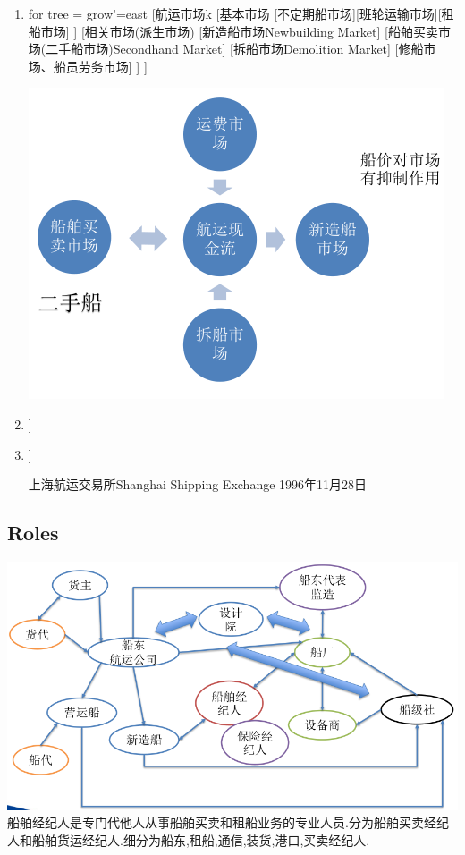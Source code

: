 \documentclass[UTF8,a4paper]{ctexart}
\begin{document}
	\begin{enumerate}[1)]
		\item 	\begin{forest}
			for tree = {grow'=east}
			[航运市场k [基本市场 
							[不定期船市场][班轮运输市场][租船市场]
							]
			   		 [相关市场(派生市场)
			   		 		[新造船市场Newbuilding Market]
			   		 		[船舶买卖市场(二手船市场)Secondhand Market]
			   		 		[拆船市场Demolition Market]
			   		 		[修船市场、船员劳务市场]
			   		 		]
			   		 ]
		\end{forest}
		\includegraphics[scale=0.7]{cashflow}
		
		\item \begin{forest}
			[国际主要航运交易市场
								[伦敦市场]
								[纽约市场]
								[汉堡奥斯陆市场]
								[东京市场]
								[香港市场]
								]
		\end{forest}
		\item \begin{forest}
			[航交所
				[规范航运市场交易行为]
				[调节航运市场价格]
				[沟通航运市场信息]
				]
			\end{forest}
		
			上海航运交易所Shanghai Shipping Exchange 1996年11月28日
	\end{enumerate}
	\subsection{Roles}
		\includegraphics[scale=0.5,trim=0 0 0 0]{roles}
		船舶经纪人是专门代他人从事船舶买卖和租船业务的专业人员.分为船舶买卖经纪人和船舶货运经纪人.细分为船东,租船,通信,装货,港口,买卖经纪人.
\end{document}
